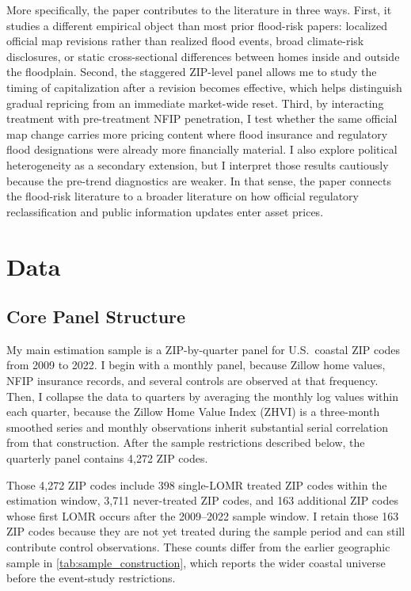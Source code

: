 \documentclass[12pt]{article}
\begin{document}
More specifically, the paper contributes to the literature in three ways. First, it studies a different empirical object than most prior flood-risk papers: localized official map revisions rather than realized flood events, broad climate-risk disclosures, or static cross-sectional differences between homes inside and outside the floodplain. Second, the staggered ZIP-level panel allows me to study the timing of capitalization after a revision becomes effective, which helps distinguish gradual repricing from an immediate market-wide reset. Third, by interacting treatment with pre-treatment NFIP penetration, I test whether the same official map change carries more pricing content where flood insurance and regulatory flood designations were already more financially material. I also explore political heterogeneity as a secondary extension, but I interpret those results cautiously because the pre-trend diagnostics are weaker. In that sense, the paper connects the flood-risk literature to a broader literature on how official regulatory reclassification and public information updates enter asset prices.
\section{Data}\label{sec:data}

\subsection{Core Panel Structure}\label{sec:data_panel}

My main estimation sample is a ZIP-by-quarter panel for U.S.\ coastal ZIP codes from 2009 to 2022. I begin with a monthly panel, because Zillow home values, NFIP insurance records, and several controls are observed at that frequency. Then, I collapse the data to quarters by averaging the monthly log values within each quarter, because the Zillow Home Value Index (ZHVI) is a three-month smoothed series and monthly observations inherit substantial serial correlation from that construction. After the sample restrictions described below, the quarterly panel contains 4,272 ZIP codes.

Those 4,272 ZIP codes include 398 single-LOMR treated ZIP codes within the estimation window, 3,711 never-treated ZIP codes, and 163 additional ZIP codes whose first LOMR occurs after the 2009--2022 sample window. I retain those 163 ZIP codes because they are not yet treated during the sample period and can still contribute control observations. These counts differ from the earlier geographic sample in \autoref{tab:sample_construction}, which reports the wider coastal universe before the event-study restrictions.
\end{document}
